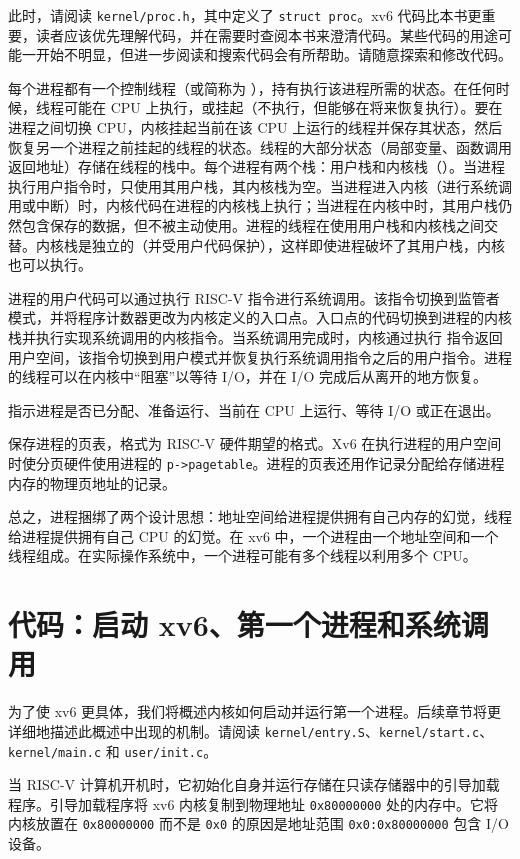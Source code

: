 此时，请阅读 {\tt kernel/proc.h}，其中定义了 {\tt struct proc}。xv6 代码比本书更重要，读者应该优先理解代码，并在需要时查阅本书来澄清代码。某些代码的用途可能一开始不明显，但进一步阅读和搜索代码会有所帮助。请随意探索和修改代码。

每个进程都有一个控制线程（或简称为 ），持有执行该进程所需的状态。在任何时候，线程可能在 CPU 上执行，或挂起（不执行，但能够在将来恢复执行）。要在进程之间切换 CPU，内核挂起当前在该 CPU 上运行的线程并保存其状态，然后恢复另一个进程之前挂起的线程的状态。线程的大部分状态（局部变量、函数调用返回地址）存储在线程的栈中。每个进程有两个栈：用户栈和内核栈（）。当进程执行用户指令时，只使用其用户栈，其内核栈为空。当进程进入内核（进行系统调用或中断）时，内核代码在进程的内核栈上执行；当进程在内核中时，其用户栈仍然包含保存的数据，但不被主动使用。进程的线程在使用用户栈和内核栈之间交替。内核栈是独立的（并受用户代码保护），这样即使进程破坏了其用户栈，内核也可以执行。

进程的用户代码可以通过执行 RISC-V  指令进行系统调用。该指令切换到监管者模式，并将程序计数器更改为内核定义的入口点。入口点的代码切换到进程的内核栈并执行实现系统调用的内核指令。当系统调用完成时，内核通过执行  指令返回用户空间，该指令切换到用户模式并恢复执行系统调用指令之后的用户指令。进程的线程可以在内核中``阻塞''以等待 I/O，并在 I/O 完成后从离开的地方恢复。

 指示进程是否已分配、准备运行、当前在 CPU 上运行、等待 I/O 或正在退出。

 保存进程的页表，格式为 RISC-V 硬件期望的格式。Xv6 在执行进程的用户空间时使分页硬件使用进程的 \lstinline{p->pagetable}。进程的页表还用作记录分配给存储进程内存的物理页地址的记录。

总之，进程捆绑了两个设计思想：地址空间给进程提供拥有自己内存的幻觉，线程给进程提供拥有自己 CPU 的幻觉。在 xv6 中，一个进程由一个地址空间和一个线程组成。在实际操作系统中，一个进程可能有多个线程以利用多个 CPU。

\section{代码：启动 xv6、第一个进程和系统调用}
为了使 xv6 更具体，我们将概述内核如何启动并运行第一个进程。后续章节将更详细地描述此概述中出现的机制。请阅读 {\tt kernel/entry.S}、{\tt kernel/start.c}、{\tt kernel/main.c} 和 {\tt user/init.c}。

当 RISC-V 计算机开机时，它初始化自身并运行存储在只读存储器中的引导加载程序。引导加载程序将 xv6 内核复制到物理地址
\texttt{0x80000000}
处的内存中。它将内核放置在
\texttt{0x80000000}
而不是
\texttt{0x0}
的原因是地址范围
\texttt{0x0:0x80000000}
包含 I/O 设备。

